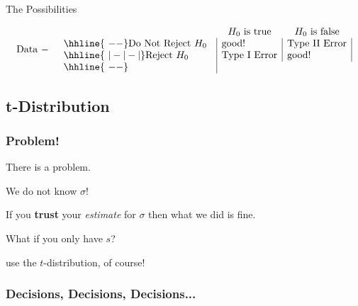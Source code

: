 \begin{frame}{The Possibilities}

  \begin{eqnarray*}
    \mathrm{Data~-} & &
      \begin{array}{l@{\hspace{1em}}|l|l|} 
        \multicolumn{1}{c}{~} & \multicolumn{1}{c}{H_0 \mathrm{~is~true}} & \multicolumn{1}{c}{H_0 \mathrm{~is~false}} \\ 
               \hhline{~--}
        \mathrm{Do~Not~Reject~}H_0 & \mathrm{good!} & \mathrm{Type~II~Error} \\ \hhline{~|-|-|}
        \mathrm{Reject~}H_0 & \mathrm{Type~I~Error} & \mathrm{good!} \\ \hhline{~--}
      \end{array}
  \end{eqnarray*}
  
\end{frame}


\subsection{t-Distribution}

\begin{frame}
  \frametitle{Problem!}

  There is a problem.

  {
    We do not know $\sigma$!
  }

  {
    If you \textbf{trust} your \textit{estimate} for $\sigma$ then
    what we did is fine.
  }

  {
    What if you only have $s$?
  }


  {
    use the $t$-distribution, of course!
  }


\end{frame}


\begin{frame}
  \frametitle{Decisions, Decisions, Decisions...}

\end{frame}


